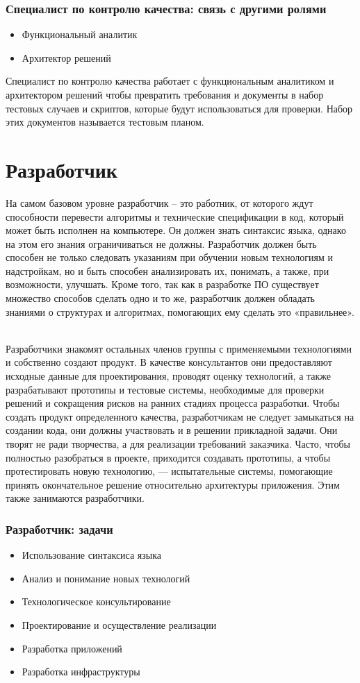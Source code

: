 \documentclass{../industrial-development}
\begin{document}
\begin{frame} \frametitle{Специалист по контролю качества: связь с другими ролями}
  \begin{itemize}
  \item Функциональный аналитик
  \item Архитектор решений
  \end{itemize}
\end{frame}
\lecturenotes
Специалист по контролю качества работает с функциональным аналитиком и архитектором решений чтобы превратить требования и документы в набор тестовых случаев и скриптов, которые будут использоваться для проверки. Набор этих документов называется тестовым планом.  ~\cite{Anatomy}

\section{Разработчик }

\lecturenotes

На самом базовом уровне разработчик – это работник, от которого ждут способности перевести алгоритмы и технические спецификации в код, который может быть исполнен на компьютере. Он должен знать синтаксис языка, однако на этом его знания ограничиваться не должны. Разработчик должен быть способен не только следовать указаниям при обучении новым технологиям и надстройкам, но и быть способен анализировать их, понимать, а также, при возможности, улучшать. Кроме того, так как в разработке ПО существует множество способов сделать одно и то же, разработчик должен обладать знаниями о структурах и алгоритмах, помогающих ему сделать это «правильнее».   ~\cite{Anatomy}

Разработчики знакомят остальных членов группы с применяемыми технологиями и собственно создают продукт. В качестве консультантов они предоставляют исходные данные для проектирования, проводят оценку технологий, а также разрабатывают прототипы и тестовые системы, необходимые для проверки решений и сокращения рисков на ранних стадиях процесса разработки. Чтобы создать продукт определенного качества, разработчикам не следует замыкаться на создании кода, они должны участвовать и в решении прикладной задачи. Они творят не ради творчества, а для реализации требований за­казчика. Часто, чтобы полностью разобраться в проекте, приходится создавать прототипы, а чтобы протестировать новую технологию, — испытательные системы, помогающие принять окончательное решение относительно архитектуры приложения. Этим также занимаются разработчики. ~\cite{Collective}
\begin{frame} \frametitle{Разработчик: задачи}
  \begin{itemize}
  \item Использование синтаксиса языка
  \item Анализ и понимание новых технологий
  \item Технологическое консультирование
\item Проектирование и осуществление реализации
\item Разработка приложений
\item Разработка инфраструктуры
  \end{itemize}
\end{frame}
\end{document}
